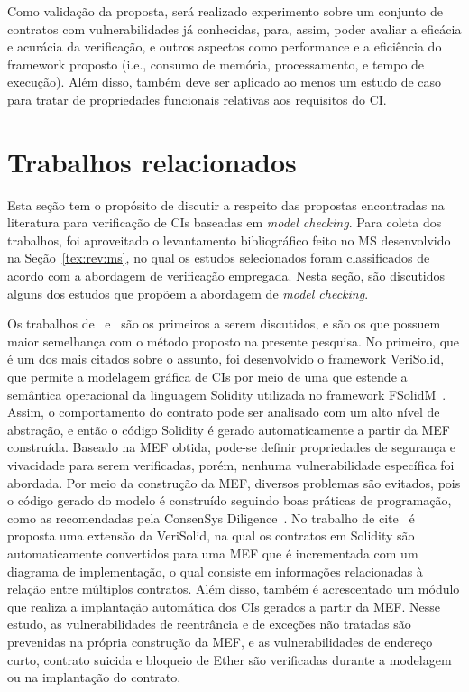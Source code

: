 Como validação da proposta, será realizado experimento sobre um conjunto de contratos com vulnerabilidades já conhecidas, para, assim, poder avaliar a eficácia e acurácia da verificação, e outros aspectos como performance e a eficiência do framework proposto (i.e., consumo de memória, processamento, e tempo de execução). Além disso, também deve ser aplicado ao menos um estudo de caso para tratar de propriedades funcionais relativas aos requisitos do CI.


\section{Trabalhos relacionados}

Esta seção tem o propósito de discutir a respeito das propostas encontradas na literatura para verificação de CIs baseadas em \textit{model checking}. Para coleta dos trabalhos, foi aproveitado o levantamento bibliográfico feito no MS desenvolvido na Seção~\ref{tex:rev:ms}, no qual os estudos selecionados foram classificados de acordo com a abordagem de verificação empregada. Nesta seção, são discutidos alguns dos estudos que propõem a abordagem de \textit{model checking}. 

Os trabalhos de~ e~ são os primeiros a serem discutidos, e são os que possuem maior semelhança com o método proposto na presente pesquisa. No primeiro, que é um dos mais citados sobre o assunto, foi desenvolvido o framework VeriSolid, que permite a modelagem gráfica de CIs por meio de uma  que estende a semântica operacional da linguagem Solidity utilizada no framework FSolidM~\cite{mavridou2018tool-95}. Assim, o comportamento do contrato pode ser analisado com um alto nível de abstração, e então o código Solidity é gerado automaticamente a partir da MEF construída. Baseado na MEF obtida, pode-se definir propriedades de segurança e vivacidade para serem verificadas, porém, nenhuma vulnerabilidade específica foi abordada. Por meio da construção da MEF, diversos problemas são evitados, pois o código gerado do modelo é construído seguindo boas práticas de programação, como as recomendadas pela ConsenSys Diligence~\cite{consensys2021bestpractices}. No trabalho de cite~ é proposta uma extensão da VeriSolid, na qual os contratos em Solidity são automaticamente convertidos para uma MEF que é incrementada com um diagrama de implementação, o qual consiste em informações relacionadas à relação entre múltiplos contratos. Além disso, também é acrescentado um módulo que realiza a implantação automática dos CIs gerados a partir da MEF. Nesse estudo, as vulnerabilidades de reentrância e de exceções não tratadas são prevenidas na própria construção da MEF, e as vulnerabilidades de endereço curto, contrato suicida e bloqueio de Ether são verificadas durante a modelagem ou na implantação do contrato. 

